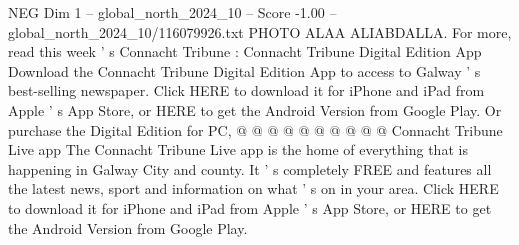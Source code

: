 \begin{textsample}{NEG Dim 1 – global\_north\_2024\_10 – Score -1.00 – global\_north\_2024\_10/116079926.txt}
PHOTO ALAA ALIABDALLA.
For more, read this week ' s Connacht Tribune : Connacht Tribune Digital Edition App Download the Connacht Tribune Digital Edition App to access to Galway ' s best-selling newspaper.
Click HERE to download it for iPhone and iPad from Apple ' s App Store, or HERE to get the Android Version from Google Play.
Or purchase the Digital Edition for PC, @ @ @ @ @ @ @ @ @ @ Connacht Tribune Live app The Connacht Tribune Live app is the home of everything that is happening in Galway City and county.
It ' s completely FREE and features all the latest news, sport and information on what ' s on in your area.
Click HERE to download it for iPhone and iPad from Apple ' s App Store, or HERE to get the Android Version from Google Play.

\end{textsample}
